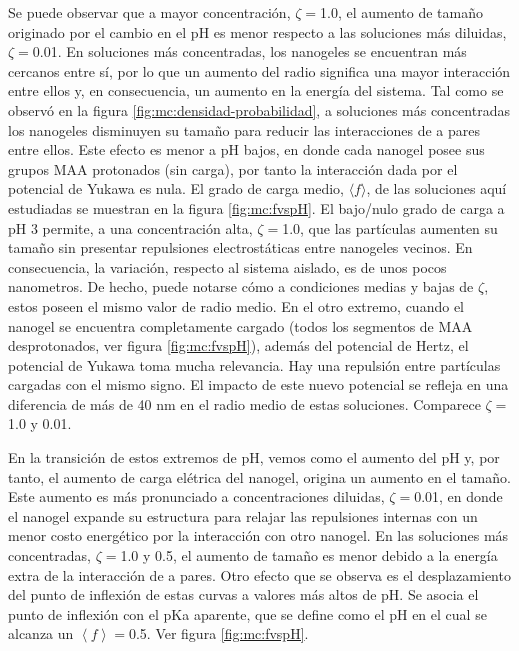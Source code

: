 	Se puede observar que a mayor concentraci\'on, $\zeta = $1.0, el aumento de tama\~no originado por el cambio en el pH es menor respecto a las soluciones m\'as diluidas, $\zeta = $0.01.
	En soluciones m\'as concentradas, los nanogeles se encuentran m\'as cercanos entre s\'i, por lo que un aumento del radio significa una mayor interacci\'on entre ellos y, en consecuencia, un aumento en la energ\'ia del sistema.
	Tal como se observ\'o en la figura \ref{fig:mc:densidad-probabilidad}, a soluciones m\'as concentradas los nanogeles disminuyen su tama\~no para reducir las interacciones de a pares entre ellos. Este efecto es menor a pH bajos, en donde cada nanogel posee sus grupos MAA protonados (sin carga), por tanto la interacción dada por el potencial de Yukawa es nula. El grado de carga medio, $\langle f \rangle$, de las soluciones aqu\'i estudiadas se muestran en la figura \ref{fig:mc:fvspH}.
	El bajo/nulo grado de carga a pH 3 permite, a una concentraci\'on alta, $\zeta = $1.0, que las part\'iculas aumenten su tama\~no sin presentar repulsiones electrost\'aticas entre nanogeles vecinos. En consecuencia, la variaci\'on, respecto al sistema aislado, es de unos pocos nanometros. De hecho, puede notarse c\'omo a condiciones medias y bajas de $\zeta$, estos poseen el mismo valor de radio medio.
	En el otro extremo, cuando el nanogel se encuentra completamente cargado (todos los segmentos de MAA desprotonados, ver figura \ref{fig:mc:fvspH}), adem\'as del potencial de Hertz, el potencial de Yukawa toma mucha relevancia. Hay una repulsi\'on entre part\'iculas cargadas con el mismo signo. El impacto de este nuevo potencial se refleja en una diferencia de m\'as de 40 nm en el radio medio de estas soluciones. Comparece $\zeta = $1.0 y 0.01.
	
	En la transici\'on de estos extremos de pH, vemos como el aumento del pH y, por tanto, el aumento de carga el\'etrica del nanogel, origina un aumento en el tama\~no. Este aumento es m\'as pronunciado a concentraciones diluidas, $\zeta = $0.01, en donde el nanogel expande su estructura para relajar las repulsiones internas con un menor costo energ\'etico por la interacci\'on con otro nanogel. En las soluciones m\'as concentradas, $\zeta = $1.0 y 0.5, el aumento de tama\~no es menor debido a la energ\'ia extra de la interacci\'on de a pares.
	Otro efecto que se observa es el desplazamiento del punto de inflexi\'on de estas curvas a valores m\'as altos de pH.
	Se asocia el punto de inflexi\'on con el pKa aparente, que se define como el pH en el cual se alcanza un $\left< f\right> = $0.5. Ver figura \ref{fig:mc:fvspH}.
	
